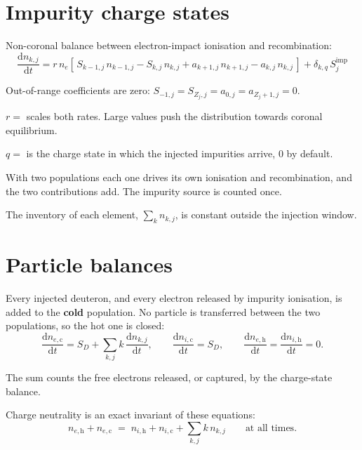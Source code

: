 \documentclass[11pt,a4paper]{article}
\newcommand{\dd}[2]{\frac{\mathrm{d}#1}{\mathrm{d}#2}}
\newcommand{\h}{\mathrm{h}}
\newcommand{\co}{\mathrm{c}}
\begin{document}
\section{Impurity charge states}

Non-coronal balance between electron-impact ionisation and recombination:
\begin{equation}
\boxed{\;
  \dd{n_{k,j}}{t} = r\, n_e \left[\, S_{k-1,j}\, n_{k-1,j} - S_{k,j}\, n_{k,j}
                  + a_{k+1,j}\, n_{k+1,j} - a_{k,j}\, n_{k,j} \,\right]
                  + \delta_{k,q}\, S^{\mathrm{imp}}_j \;}
\end{equation}

Out-of-range coefficients are zero: $S_{-1,j} = S_{Z_j,j} = a_{0,j} = a_{Z_j+1,j} = 0$.

$r = $  scales both rates. Large values push the
distribution towards coronal equilibrium.

$q = $  is the charge state in which the injected impurities
arrive, $0$ by default.

With two populations each one drives its own ionisation and recombination, and the two
contributions add. The impurity source is counted once.

The inventory of each element, $\sum_k n_{k,j}$, is constant outside the injection window.

\section{Particle balances}

Every injected deuteron, and every electron released by impurity ionisation, is added to the
\textbf{cold} population. No particle is transferred between the two populations, so the hot
one is closed:
\begin{equation}
\boxed{\;
  \dd{n_{e,\co}}{t} = S_D + \sum_{k,j} k\, \dd{n_{k,j}}{t} ,
  \qquad
  \dd{n_{i,\co}}{t} = S_D ,
  \qquad
  \dd{n_{e,\h}}{t} = \dd{n_{i,\h}}{t} = 0 . \;}
\end{equation}

The sum counts the free electrons released, or captured, by the charge-state balance.

Charge neutrality is an exact invariant of these equations:
\begin{equation}
  n_{e,\h} + n_{e,\co} \;=\; n_{i,\h} + n_{i,\co} + \sum_{k,j} k\, n_{k,j}
  \qquad \text{at all times.}
\end{equation}
\end{document}
